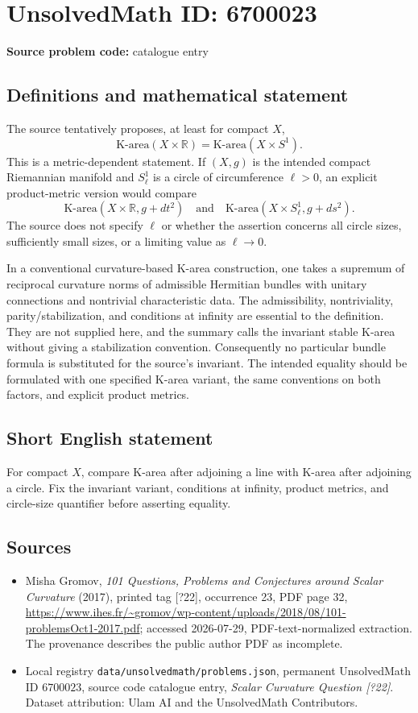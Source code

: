 \documentclass[11pt]{article}
\begin{document}
\section*{UnsolvedMath ID: 6700023}
\textbf{Source problem code:} catalogue entry
\subsection{Definitions and mathematical statement}
The source tentatively proposes, at least for compact $X$,
\[
\mathrm{K\!\text{-}area}(X\times\mathbb R)
=\mathrm{K\!\text{-}area}(X\times S^1).
\]
This is a metric-dependent statement. If $(X,g)$ is the intended compact Riemannian manifold and $S^1_\ell$ is a circle of circumference $\ell>0$, an explicit product-metric version would compare
\[
\mathrm{K\!\text{-}area}(X\times\mathbb R,g+dt^2)
\quad\text{and}\quad
\mathrm{K\!\text{-}area}(X\times S^1_\ell,g+ds^2).
\]
The source does not specify $\ell$ or whether the assertion concerns all circle sizes, sufficiently small sizes, or a limiting value as $\ell\to0$.

In a conventional curvature-based K-area construction, one takes a supremum of reciprocal curvature norms of admissible Hermitian bundles with unitary connections and nontrivial characteristic data. The admissibility, nontriviality, parity/stabilization, and conditions at infinity are essential to the definition. They are not supplied here, and the summary calls the invariant stable K-area without giving a stabilization convention. Consequently no particular bundle formula is substituted for the source's invariant. The intended equality should be formulated with one specified K-area variant, the same conventions on both factors, and explicit product metrics.
\subsection{Short English statement}
For compact $X$, compare K-area after adjoining a line with K-area after adjoining a circle. Fix the invariant variant, conditions at infinity, product metrics, and circle-size quantifier before asserting equality.
\subsection{Sources}
\begin{itemize}
\item Misha Gromov, \emph{101 Questions, Problems and Conjectures around Scalar Curvature} (2017), printed tag [?22], occurrence 23, PDF page 32, \url{https://www.ihes.fr/~gromov/wp-content/uploads/2018/08/101-problemsOct1-2017.pdf}; accessed 2026-07-29, PDF-text-normalized extraction. The provenance describes the public author PDF as incomplete.
\item Local registry \texttt{data/unsolvedmath/problems.json}, permanent UnsolvedMath ID $6700023$, source code catalogue entry, \emph{Scalar Curvature Question [?22]}. Dataset attribution: Ulam AI and the UnsolvedMath Contributors.
\end{itemize}
\end{document}
